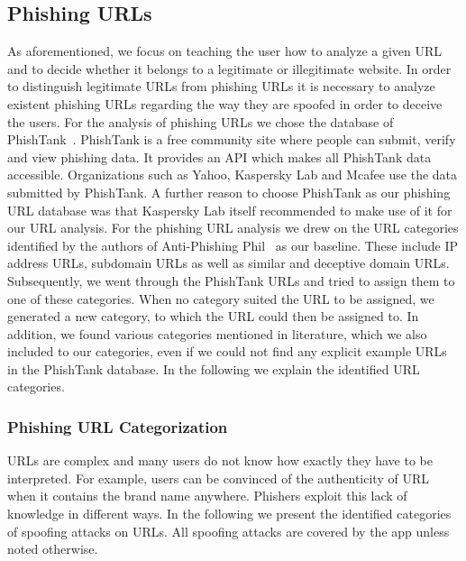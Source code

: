 \subsection{Phishing URLs}
As aforementioned, we focus on teaching the user how to analyze a given URL and to decide whether it belongs to a legitimate or illegitimate website.
 In order to distinguish legitimate URLs from phishing URLs it is necessary to analyze existent phishing URLs regarding the way they are spoofed in order to deceive the users.
 For the analysis of phishing URLs we chose the database of PhishTank~\cite{phishtank}.
PhishTank is a free community site where people can submit, verify and view phishing data.
 It provides an API which makes all PhishTank data accessible.
 Organizations such as Yahoo, Kaspersky Lab and Mcafee use the data submitted by PhishTank. A further reason to choose PhishTank as our phishing URL database was that Kaspersky Lab itself recommended to make use of it for our URL analysis.
 For the phishing URL analysis we drew on the URL categories identified by the authors of Anti-Phishing Phil~\cite{sheng2007antiphishingphil} as our baseline.
 These include IP address URLs, subdomain URLs as well as similar and deceptive domain URLs.
 Subsequently, we went through the PhishTank URLs and tried to assign them to one of these categories.
 When no category suited the URL to be assigned, we generated a new category, to which the URL could then be assigned to.
 In addition, we found various categories mentioned in literature, which we also included to our categories, even if we could not find any explicit example URLs in the PhishTank database.
 In the following we explain the identified URL categories.
\subsubsection{Phishing URL Categorization}
\label{s:url_categories}
URLs are complex and many users do not know how exactly they have to be interpreted.
 For example, users can be convinced of the authenticity of URL when it contains the brand name anywhere.
 Phishers exploit this lack of knowledge in different ways.
 In the following we present the identified categories of spoofing attacks on URLs. 
 All spoofing attacks are covered by the app unless noted otherwise.

